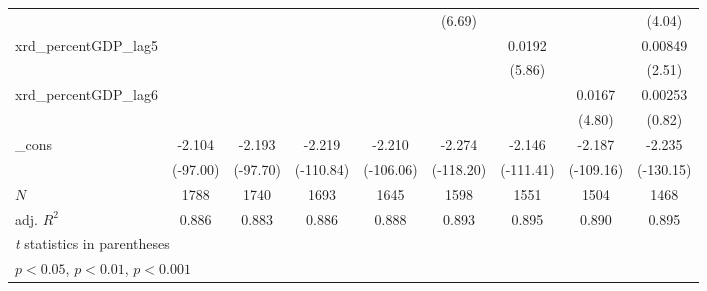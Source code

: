 {\begin{tabular}{l*{8}{c}}
          &                  &                  &                  &                  &   (6.69)         &                  &                  &   (4.04)         \\
\addlinespace
xrd\_percentGDP\_lag5&                  &                  &                  &                  &                  &   0.0192\sym{***}&                  &  0.00849\sym{*}  \\
          &                  &                  &                  &                  &                  &   (5.86)         &                  &   (2.51)         \\
\addlinespace
xrd\_percentGDP\_lag6&                  &                  &                  &                  &                  &                  &   0.0167\sym{***}&  0.00253         \\
          &                  &                  &                  &                  &                  &                  &   (4.80)         &   (0.82)         \\
\addlinespace
\_cons    &   -2.104\sym{***}&   -2.193\sym{***}&   -2.219\sym{***}&   -2.210\sym{***}&   -2.274\sym{***}&   -2.146\sym{***}&   -2.187\sym{***}&   -2.235\sym{***}\\
          & (-97.00)         & (-97.70)         &(-110.84)         &(-106.06)         &(-118.20)         &(-111.41)         &(-109.16)         &(-130.15)         \\
\midrule
\(N\)     &     1788         &     1740         &     1693         &     1645         &     1598         &     1551         &     1504         &     1468         \\
adj. \(R^{2}\)&    0.886         &    0.883         &    0.886         &    0.888         &    0.893         &    0.895         &    0.890         &    0.895         \\
\bottomrule
\multicolumn{9}{l}{\footnotesize \textit{t} statistics in parentheses}\\
\multicolumn{9}{l}{\footnotesize \sym{*} \(p<0.05\), \sym{**} \(p<0.01\), \sym{***} \(p<0.001\)}\\
\end{tabular}
}

